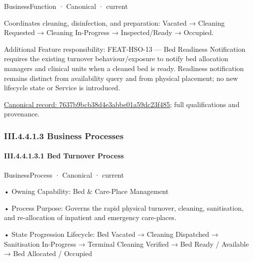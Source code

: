 \label{element:7637b9bcb38d4e3abbe01a59dc23f485}
{\small BusinessFunction · Canonical · current}\par

Coordinates cleaning, disinfection, and preparation: Vacated → Cleaning Requested → Cleaning In-Progress → Inspected/Ready → Occupied.



Additional Feature responsibility: FEAT-HSO-13 — Bed Readiness Notification requires the existing turnover behaviour/exposure to notify bed allocation managers and clinical units when a cleaned bed is ready. Readiness notification remains distinct from availability query and from physical placement; no new lifecycle state or Service is introduced.


{\footnotesize \href{../../../../../../../continuum/business/business-function/7637b9bcb38d4e3abbe01a59dc23f485.md}{Canonical record: 7637b9bcb38d4e3abbe01a59dc23f485}; full qualifications and provenance.}\par
\subsubsection*{III.4.4.1.3 Business Processes}
\label{navigation:III.4.4.1.3}

\paragraph*{III.4.4.1.3.1 Bed Turnover Process}
\label{navigation:III.4.4.1.3.1}

\label{element:69f74289926942f4baed4acf4c654a3b}
{\small BusinessProcess · Canonical · current}\par

•
Owning Capability: Bed \& Care-Place Management



•
Process Purpose: Governs the rapid physical turnover, cleaning, sanitisation, and re-allocation of inpatient and emergency care-places.



•
State Progression Lifecycle: Bed Vacated → Cleaning Dispatched → Sanitisation In-Progress → Terminal Cleaning Verified → Bed Ready / Available → Bed Allocated / Occupied



